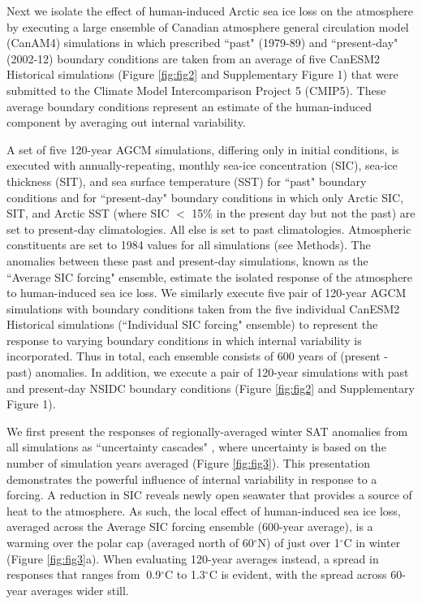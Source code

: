 \documentclass{nature}
\begin{document}
Next we isolate the effect of human-induced Arctic sea ice loss on the atmosphere by executing a large ensemble of Canadian atmosphere general circulation model (CanAM4) simulations in which prescribed ``past" (1979-89) and ``present-day" (2002-12) boundary conditions are taken from an average of five CanESM2 Historical simulations (Figure \ref{fig:fig2} and Supplementary Figure 1) that were submitted to the Climate Model Intercomparison Project 5 (CMIP5). These average boundary conditions represent an estimate of the human-induced component by averaging out internal variability. 

A set of five 120-year AGCM simulations, differing only in initial conditions, is executed with annually-repeating, monthly sea-ice concentration (SIC), sea-ice thickness (SIT), and sea surface temperature (SST) for ``past" boundary conditions and for ``present-day" boundary conditions in which only Arctic SIC, SIT, and Arctic SST (where SIC $<$ 15\% in the present day but not the past) are set to present-day climatologies. All else is set to past climatologies. Atmospheric constituents are set to 1984 values for all simulations (see Methods). The anomalies between these past and present-day simulations, known as the ``Average SIC forcing" ensemble, estimate the isolated response of the atmosphere to human-induced sea ice loss. We similarly execute five pair of 120-year AGCM simulations with boundary conditions taken from the five individual CanESM2 Historical simulations (``Individual SIC forcing" ensemble) to represent the response to varying boundary conditions in which internal variability is incorporated. Thus in total, each ensemble consists of 600 years of (present - past) anomalies. In addition, we execute a pair of 120-year simulations with past and present-day NSIDC boundary conditions (Figure \ref{fig:fig2} and Supplementary Figure 1).

We first present the responses of regionally-averaged winter SAT anomalies from all simulations as ``uncertainty cascades" \cite{wilby10,swart15}, where uncertainty is based on the number of simulation years averaged (Figure \ref{fig:fig3}). This presentation demonstrates the powerful influence of internal variability in response to a forcing. A reduction in SIC reveals newly open seawater that provides a source of heat to the atmosphere. As such, the local effect of human-induced sea ice loss, averaged across the Average SIC forcing ensemble (600-year average), is a warming over the polar cap (averaged north of 60$^\circ$N) of just over 1$^\circ$C in winter (Figure \ref{fig:fig3}a). When evaluating 120-year averages instead, a spread in responses that ranges from $~$0.9$^\circ$C to 1.3$^\circ$C is evident, with the spread across 60-year averages wider still. 
\end{document}

